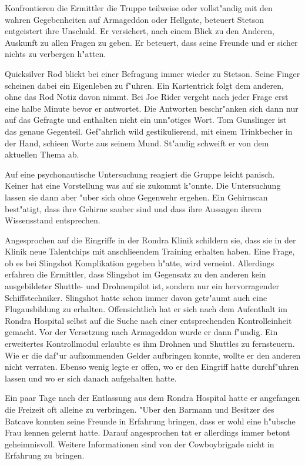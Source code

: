 Konfrontieren die Ermittler die Truppe teilweise oder vollst"andig mit den wahren Gegebenheiten auf Armageddon oder Hellgate, beteuert Stetson entgeistert ihre Unschuld. Er versichert, nach einem Blick zu den Anderen, Auskunft zu allen Fragen zu geben. Er beteuert, dass seine Freunde und er sicher nichts zu verbergen h"atten. 

Quicksilver Rod blickt bei einer Befragung immer wieder zu Stetson. Seine Finger scheinen dabei ein Eigenleben zu f"uhren. Ein Kartentrick folgt dem anderen, ohne das Rod Notiz davon nimmt. Bei Joe Rider vergeht nach jeder Frage erst eine halbe Minute bevor er antwortet. Die Antworten beschr"anken sich dann nur auf das Gefragte und enthalten nicht ein unn"otiges Wort. Tom Gunslinger ist das genaue Gegenteil. Gef"ahrlich wild gestikulierend, mit einem Trinkbecher in der Hand, schie\3en Worte aus seinem Mund. St"andig schweift er von dem aktuellen Thema ab.

Auf eine psychonautische Untersuchung reagiert die Gruppe leicht panisch. Keiner hat eine Vorstellung was auf sie zukommt k"onnte. Die Untersuchung lassen sie dann aber "uber sich ohne Gegenwehr ergehen. Ein Gehirnscan best"atigt, dass ihre Gehirne sauber sind und dass ihre Aussagen ihrem Wissensstand entsprechen. 

Angesprochen auf die Eingriffe in der Rondra Klinik schildern sie, dass sie in der Klinik neue Talentchips mit anschlie\3endem Training erhalten haben. Eine Frage, ob es bei Slingshot Komplikation gegeben h"atte, wird verneint. Allerdings erfahren die Ermittler, dass Slingshot im Gegensatz zu den anderen kein ausgebildeter Shuttle- und Drohnenpilot ist, sondern nur ein hervorragender Schiffstechniker. Slingshot hatte schon immer davon getr"aumt auch eine Flugausbildung zu erhalten. Offensichtlich hat er sich nach dem Aufenthalt im Rondra Hospital selbst auf die Suche nach einer entsprechenden Kontrolleinheit gemacht. Vor der Versetzung nach Armageddon wurde er dann f"undig. 
Ein erweitertes Kontrollmodul erlaubte es ihm Drohnen und Shuttles zu fernsteuern. Wie er die daf"ur aufkommenden Gelder aufbringen konnte, wollte er den anderen nicht verraten. Ebenso wenig legte er offen, wo er den Eingriff hatte durchf"uhren lassen und wo er sich danach aufgehalten hatte. 

Ein paar Tage nach der Entlassung aus dem Rondra Hospital hatte er angefangen die Freizeit oft alleine zu verbringen. "Uber den Barmann und Besitzer des Batcave konnten seine Freunde in Erfahrung bringen, dass er wohl eine h"ubsche Frau kennen gelernt hatte. Darauf angesprochen tat er allerdings immer betont geheimnisvoll. Weitere Informationen sind von der Cowboybrigade nicht in Erfahrung zu bringen.

